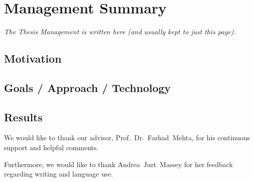 
\chapter{Management Summary}
\addchaptertocentry{\abstractname} %
\emph{The Thesis Management is written here (and usually kept to just this page).}


\section*{Motivation} %

\section*{Goals / Approach / Technology}

\section*{Results}



\begin{acknowledgements}
\addchaptertocentry{\acknowledgementname} %
We would like to thank our advisor, Prof.~Dr.~Farhad~Mehta, for his continuous support and helpful comments.

Furthermore, we would like to thank Andrea~Jurt~Massey for her feedback regarding writing and language use.

\end{acknowledgements}


\setcounter{tocdepth}{2}
\tableofcontents %



